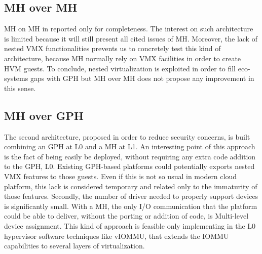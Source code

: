 \documentclass{acm_proc_article-sp} %
\begin{document}

\subsection{MH over MH}

MH on MH in reported only for completeness. The interest on such architecture is limited because it will still present all cited issues of MH.
Moreover, the lack of nested VMX functionalities prevents us to concretely test this kind of architecture, because MH normally rely on VMX facilities in order to create HVM guests.
To conclude, nested virtualization is exploited in order to fill eco-systems gaps with GPH but MH over MH does not propose any improvement in this sense.

\subsection{MH over GPH}
\label{par:mog}

The second architecture, proposed in order to reduce security concerns, is built combining an GPH at L0 and a MH at L1. 
An interesting point of this approach is the fact of being easily be deployed, without requiring any extra code addition to the GPH, L0.  Existing GPH-based platforms could potentially exports nested VMX features to those guests. Even if this is not so usual in modern cloud platform, this lack is considered temporary and related only to the immaturity of those features.
Secondly, the number of driver needed to properly support devices is significantly small. With a MH, the only I/O communication that the platform could be able to deliver, without the porting or addition of code, is Multi-level device assignment. This kind of approach is feasible only implementing in the L0 hypervisor software techniques like vIOMMU, that extends the IOMMU capabilities to several layers of virtualization.
\end{document}
